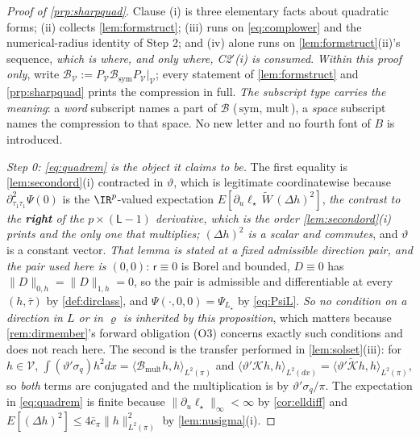 \begin{proof}[Proof of \cref{prp:sharpquad}]
Clause (i) is three elementary facts about quadratic forms; (ii) collects \cref{lem:formstruct}; (iii)
runs on \eqref{eq:complower} and the numerical-radius identity of Step 2; and (iv) alone runs on
\cref{lem:formstruct}(ii)'s sequence, \emph{which is where, and only where, C2$'$(i) is consumed}.
\emph{Within this proof only}, write
$\mathcal B_{\mathcal V}:=P_{\mathcal V}\mathcal B_{\mathrm{sym}}P_{\mathcal V}|_{\mathcal V}$; every
statement of \cref{lem:formstruct} and \cref{prp:sharpquad} prints the compression in full. \emph{The
subscript type carries the
meaning}: a \emph{word} subscript names a part of $\mathcal B$ (\,$\mathrm{sym}$, $\mathrm{mult}$\,), a
\emph{space} subscript names the compression to that space. No new letter and no fourth font of $B$ is
introduced.

\emph{Step 0: \eqref{eq:quadrem} is the object it claims to be.} The first equality is
\cref{lem:secondord}(i) contracted in $\vartheta$, which is legitimate coordinatewise because
$\partial^{2}_{\tau_1\tau_1}\Psi(0)$ is the $\IR^{p}$-valued expectation
$E[\partial_u\ell_\star\,\widetilde W\,(\Delta h)^{2}]$, \emph{the contrast to the \textbf{right} of
the $p\times(\mathsf L-1)$ derivative, which is the order \cref{lem:secondord}\textup{(i)} prints and the
only one that multiplies; $(\Delta h)^{2}$ is a scalar and commutes}, and $\vartheta$ is a constant vector. \emph{That lemma
is stated at a fixed admissible direction pair, and the pair used here is $(0,0)$}: $\mathsf r\equiv0$ is
Borel and bounded, $D\equiv0$ has $\|D\|_{0,h}=\|D\|_{1,h}=0$, so the pair is admissible and
differentiable at every $(h,\bar\tau)$ by \cref{def:dirclass}, and $\Psi(\cdot,0,0)=\Psi_{L_\star}$ by
\eqref{eq:PsiL}. \emph{So no condition on a direction in $L$ or in $\varrho$ is inherited by this
proposition}, which matters because \cref{rem:dirmember}'s forward obligation (O3) concerns exactly such
conditions and does not reach here. The second is
the transfer performed in \cref{lem:solset}(iii): for $h\in\mathcal V$,
$\int(\vartheta'\sigma_q)h^{2}dx=\langle\mathcal B_{\mathrm{mult}}h,h\rangle_{L^{2}(\pi)}$ and
$\langle\vartheta'\mathcal Kh,h\rangle_{L^{2}(dx)}=\langle\vartheta'\tilde{\mathcal K}h,h\rangle_{L^{2}(\pi)}$,
so \emph{both} terms are conjugated and the multiplication is by $\vartheta'\sigma_q/\pi$. The expectation
in \eqref{eq:quadrem} is finite because $\|\partial_u\ell_\star\|_\infty<\infty$ by \cref{cor:elldiff} and
$E[(\Delta h)^{2}]\le4\bar c_\pi\|h\|^{2}_{L^{2}(\pi)}$ by \cref{lem:nusigma}(i).


\end{proof}
